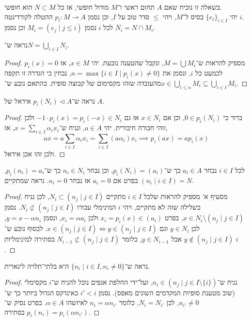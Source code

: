 \question{}
בשאלה זו נוכיח שאם $A$ תחום ראשי ו־$M$ מודול חופשי, אז כל $N \subset M$ הוא חופשי. \\
יהי ${\{ e_i \}}_{i \in I}$ בסיס ל־$M$, ויהי $\le$ סדר טוב על $I$, וכן נסמן $p_i : M \to A$ ההטלה לקורדינטה $i$. \\
לכל $i$ נסמן $M_i = (e_j \mid j \le i)$ וכן נסמן $N_i = N \cap M_i$.

\subquestion{}
נראה ש־$N = \bigcup_{i \in I} N_i$.
\begin{proof}
	מספיק להראות ש־$M = \bigcup M_i$, ונקבל שהטענה נובעת.
	יהי $x \in M$, אז $p_i(x) = 0$ לכמעט כל $i$, ונסמן את $n = \max\{ i \in I \mid p_i(x) \ne 0 \}$, נבחין כי הגדרה זו תקפה מהעובדה שזהו מקסימום של קבוצה סופית.
	בהתאם נובע ש־$x \in \bigcup_{i \le n} M_i \subseteq \bigcup_{i \in I} M_i$.
\end{proof}

\subquestion{}
נראה ש־$p_i(N_i) \triangleleft A$ אידאל של $A$.
\begin{proof}
	ברור כי $0 \in p_i(N_i)$, וכן אם $x \in N_i$ אז גם $-1 \cdot p_i(x) = p_i(-x) \in N_i$ ולכן זוהי חבורה חיבורית.
	יהי $a \in A$, ונניח ש־$x = \sum_{i \in I} \alpha_i x_i$, אז,
	\[
		a x
		= a \sum_{i \in I} \alpha_i x_i
		= \sum_{i \in I} (a \alpha_i) x_i
		\implies p_i(a x)
		= a p_i(x)
	\]
	ולכן זהו אכן אידאל.
\end{proof}

לכל $i \in I$ נבחר $a_i \in A$ כך ש־$p_i(N_i) = (a_i)$, וכן נבחר $n_i \in N_i$ כך ש־$p_i(n_i) = a_i$, בפרט אם $a_i = 0$ אז נבחר $n_i = 0$.
\subquestion{}
נראה שמתקיים $(n_i \mid i \in I) = N$.
\begin{proof}
	מסעיף א' מספיק להראות שלכל $i \in I$ מתקיים $N_i \subset (n_j \mid j \in I)$, לכן נניח בשלילה שזה לא מתקיים, ויהי $i$ המינימלי עבורו $N_i \not\subset (n_j \mid j \in I)$.
	נסמן $x \in N_i \setminus (n_j \mid j \in I)$, בפרט $x_i = p_i(x) \in (a_i)$ ולכן $x_i = \alpha a_i$, ונסמן $y = x - \alpha n_i$, לכן $y \in N_i$ וגם $x \in (n_j \mid j \in I) \iff y \in (n_j \mid j \in I)$.
	לבסוף נובע ש־$y \notin (n_j \mid j \in I)$ אבל $y \in N_{i - 1}$, כלומר $N_{i - 1} \not\subset (n_j \mid j \in I)$ בסתירה למינימליות $i$.
\end{proof}

\subquestion{}
נראה ש־$\{ n_i \mid i \in I, n_i \ne 0 \}$ היא בלתי־תלויה לינארית.
\begin{proof}
	נניח ש־$n_i \in (n_j \mid j \in I \setminus \{ i \})$, ועל־ידי החלפת אגפים נוכל להניח ש־$i$ מקסימלי (שוב מטענת סופיות המקדמים השונים מאפס).
	נסמן $i' < i$ כאינדקס הגדול ביותר כך ש־$n_{i'} \ne 0$, לכן $N_i = N_{i'}$, כלומר $n_i = \alpha n_{i'}$ לאיזשהו $\alpha \in A$.
	בפרט נסיק ש־$p_i(n_i) = p_i(\alpha n_{i'})$ בסתירה.
\end{proof}

